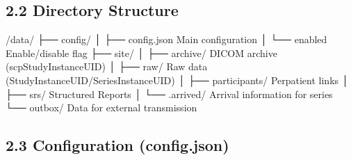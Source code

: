 \documentclass[letterpaper,10pt,english]{sphinxmanual}
\begin{document}
\subsection{2.2 Directory Structure}
\label{\detokenize{Temp/admin-options:directory-structure}}
\begin{sphinxVerbatim}[commandchars=\\\{\}]
/data/
├── config/
│   ├── config.json          \PYGZsh{} Main configuration
│   └── enabled              \PYGZsh{} Enable/disable flag
├── site/
│   ├── archive/             \PYGZsh{} DICOM archive (scp\PYGZus{}\PYGZlt{}StudyInstanceUID\PYGZgt{})
│   ├── raw/                 \PYGZsh{} Raw data (StudyInstanceUID/SeriesInstanceUID)
│   ├── participants/        \PYGZsh{} Per\PYGZhy{}patient links
│   ├── srs/                 \PYGZsh{} Structured Reports
│   └── .arrived/            \PYGZsh{} Arrival information for series
└── outbox/                  \PYGZsh{} Data for external transmission
\end{sphinxVerbatim}


\subsection{2.3 Configuration (config.json)}
\label{\detokenize{Temp/admin-options:configuration-config-json}}
\begin{sphinxVerbatim}[commandchars=\\\{\}]
\end{sphinxVerbatim}
\end{document}
